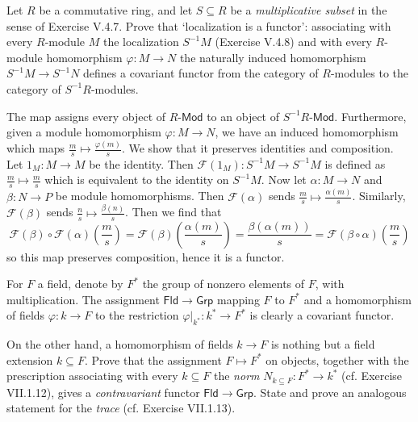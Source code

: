 \documentclass[../../master.tex]{subfiles}
\begin{document}
\begin{problem}
    Let $R$ be a commutative ring, and let $S \subseteq R$ be a \textit{multiplicative subset} in the sense of Exercise V.4.7.
    Prove that `localization is a functor': 
    associating with every $R$-module $M$ the localization $S^{-1}M$ (Exercise V.4.8) and with every $R$-module homomorphism $\varphi : M \to N$ the naturally induced homomorphism $S^{-1}M \to S^{-1}N$ defines a covariant functor from the category of $R$-modules to the category of $S^{-1}R$-modules.
\end{problem}

\begin{solution}
    The map assigns every object of $R\textsf{-Mod}$ to an object of $S^{-1}R\textsf{-Mod}$.
    Furthermore, given a module homomorphism $\varphi: M \to N$, we have an induced homomorphism which maps $\frac{m}{s} \mapsto \frac{\varphi(m)}{s}$.
    We show that it preserves identities and composition.
    Let $1_M : M \to M$ be the identity.
    Then $\mathscr{F}(1_M) : S^{-1}M \to S^{-1}M$ is defined as $\frac{m}{s} \mapsto \frac{m}{s}$ which is equivalent to the identity on $S^{-1}M$.
    Now let $\alpha: M \to N$ and $\beta: N \to P$ be module homomorphisms.
    Then $\mathscr{F}(\alpha)$ sends $\frac{m}{s} \mapsto \frac{\alpha(m)}{s}$.
    Similarly, $\mathscr{F}(\beta)$ sends $\frac{n}{s} \mapsto \frac{\beta(n)}{s}$.
    Then we find that
    \[
        \mathscr{F}(\beta) \circ \mathscr{F}(\alpha) \left(\frac{m}{s}\right) = \mathscr{F}(\beta) \left(\frac{\alpha(m)}{s}\right) = \frac{\beta(\alpha(m))}{s} = \mathscr{F}(\beta \circ \alpha) \left(\frac{m}{s}\right)
    \]
    so this map preserves composition, hence it is a functor.
\end{solution}

\begin{problem}
    For $F$ a field, denote by $F^{*}$ the group of nonzero elements of $F$, with multiplication.
    The assignment $\mathsf{Fld} \to \mathsf{Grp}$ mapping $F$ to $F^{*}$ and a homomorphism of fields $\varphi: k \to F$ to the restriction $\varphi|_{k^{*}} :k^{*} \to F^{*}$ is clearly a covariant functor.

    On the other hand, a homomorphism of fields $k \to F$ is nothing but a field extension $k \subseteq F$.
    Prove that the assignment $F \mapsto F^{*}$ on objects, together with the prescription associating with every $k \subseteq F$ the \textit{norm} $N_{k \subseteq F} : F^{*} \to k^{*}$ (cf. Exercise VII.1.12), gives a \textit{contravariant} functor $\mathsf{Fld} \to \mathsf{Grp}$.
    State and prove an analogous statement for the \textit{trace} (cf. Exercise VII.1.13).
\end{problem}
\end{document}
